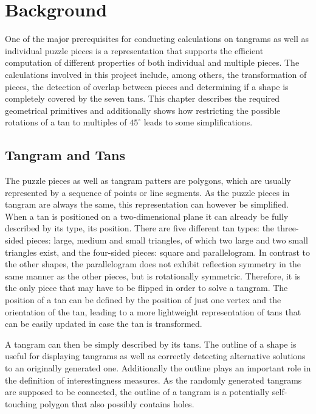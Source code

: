 \chapter{Background}\label{chapter:background}

One of the major prerequisites for conducting calculations on tangrams as well as individual puzzle pieces is a representation that supports the efficient computation of different properties of both individual and multiple pieces. The calculations involved in this project include, among others, the transformation of pieces, the detection of overlap between pieces and determining if a shape is completely covered by the seven tans. This chapter describes the required geometrical primitives and additionally shows how restricting the possible rotations of a tan to multiples of $45^{\circ}$ leads to some simplifications.

\section{Tangram and Tans}

The puzzle pieces as well as tangram patters are polygons, which are usually represented by a sequence of points or line segments. As the puzzle pieces in tangram are always the same, this representation can however be simplified. When a tan is positioned on a two-dimensional plane it can already be fully described by its type, its position. There are five different tan types: the three-sided pieces: large, medium and small triangles, of which two large and two small triangles exist, and the four-sided pieces: square and parallelogram. In contrast to the other shapes, the parallelogram does not exhibit reflection symmetry in the same manner as the other pieces, but is rotationally symmetric. Therefore, it is the only piece that may have to be flipped in order to solve a tangram. The position of a tan can be defined by the position of just one vertex and the orientation of the tan, leading to a more lightweight representation of tans that can be easily updated in case the tan is transformed. 

A tangram can then be simply described by its tans. The outline of a shape is useful for displaying tangrams as well as correctly detecting alternative solutions to an originally generated one. Additionally the outline plays an important role in the definition of interestingness measures. As the randomly generated tangrams are supposed to be connected, the outline of a tangram is a potentially self-touching polygon that also possibly contains holes.

